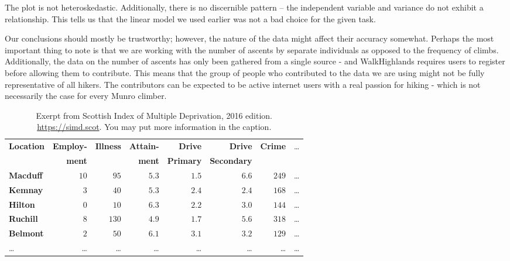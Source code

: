 \documentclass[11pt,a4paper]{article}
\begin{document}
\medskip 

The plot is not heteroskedastic. Additionally, there is no discernible pattern – the independent variable and variance do not exhibit a relationship. This tells us that the linear model we used earlier was not a bad choice for the given task.

\medskip 

Our conclusions should mostly be trustworthy; however, the nature of the data might affect their accuracy somewhat. Perhaps the most important thing to note is that we are working with the number of ascents by separate individuals as opposed to the frequency of climbs. Additionally, the data on the number of ascents has only been gathered from a single source - and WalkHighlands requires users to register before allowing them to contribute. This means that the group of people who contributed to the data we are using might not be fully representative of all hikers. The contributors can be expected to be active internet users with a real passion for hiking - which is not necessarily the case for every Munro climber.


\begin{table}[b]
  \caption{Exerpt from Scottish Index of Multiple Deprivation, 2016 edition.
    \url{https://simd.scot}. You may put more information in the caption.}
  \label{tab:example1}
\begin{tabular}{lrrrrrrr}
\hline\hline
\textbf{Location}&\textbf{Employ-}&\textbf{Illness}&\textbf{Attain-}&\textbf{Drive}  &\textbf{Drive}    &\textbf{Crime}&\dots\\
                 &\textbf{ment}   &                &\textbf{ment}   &\textbf{Primary}&\textbf{Secondary}&              &\\
\hline
\textbf{Macduff}&$10$&$ 95$&$5.3$&$1.5$&$6.6$&$249$&\dots\tabularnewline
\textbf{Kemnay}&$ 3$&$ 40$&$5.3$&$2.4$&$2.4$&$168$&\dots\tabularnewline
\textbf{Hilton}&$ 0$&$ 10$&$6.3$&$2.2$&$3.0$&$144$&\dots\tabularnewline
\textbf{Ruchill}&$ 8$&$130$&$4.9$&$1.7$&$5.6$&$318$&\dots\tabularnewline
\textbf{Belmont}&$ 2$&$ 50$&$6.1$&$3.1$&$3.2$&$129$&\dots\tabularnewline
\dots&\dots&\dots&\dots&\dots&\dots&\dots&\dots\tabularnewline
\hline
\end{tabular}
\end{table}
\end{document}
